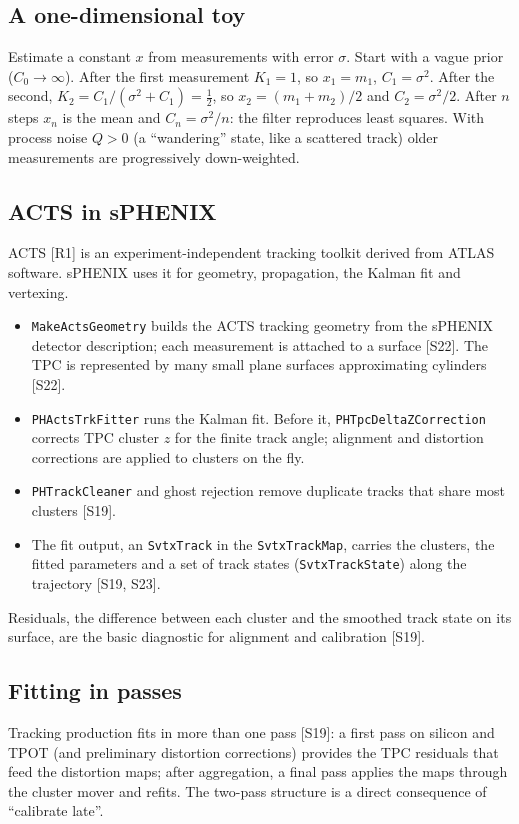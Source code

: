 \documentclass[11pt,letterpaper]{article}
\begin{document}
\subsection{A one-dimensional toy}
Estimate a constant $x$ from measurements with error $\sigma$. Start with a vague prior ($C_0\to\infty$).
After the first measurement $K_1=1$, so $x_1=m_1$, $C_1=\sigma^2$. After the second, $K_2=C_1/(\sigma^2+C_1)=\tfrac12$, so $x_2=(m_1+m_2)/2$ and $C_2=\sigma^2/2$.
After $n$ steps $x_n$ is the mean and $C_n=\sigma^2/n$: the filter reproduces least squares. With process noise $Q>0$ (a ``wandering'' state, like a scattered track) older measurements are progressively down-weighted.

\subsection{ACTS in sPHENIX}
ACTS [R1] is an experiment-independent tracking toolkit derived from ATLAS software. sPHENIX uses it for geometry, propagation, the Kalman fit and vertexing.
\begin{itemize}
\item \texttt{MakeActsGeometry} builds the ACTS tracking geometry from the sPHENIX detector description; each measurement is attached to a surface [S22].
The TPC is represented by many small plane surfaces approximating cylinders [S22].
\item \texttt{PHActsTrkFitter} runs the Kalman fit. Before it, \texttt{PHTpcDeltaZCorrection} corrects TPC cluster $z$ for the finite track angle; alignment and distortion corrections are applied to clusters on the fly.
\item \texttt{PHTrackCleaner} and ghost rejection remove duplicate tracks that share most clusters [S19].
\item The fit output, an \texttt{SvtxTrack} in the \texttt{SvtxTrackMap}, carries the clusters, the fitted parameters and a set of track states (\texttt{SvtxTrackState}) along the trajectory [S19, S23].
\end{itemize}
Residuals, the difference between each cluster and the smoothed track state on its surface, are the basic diagnostic for alignment and calibration [S19].

\subsection{Fitting in passes}
Tracking production fits in more than one pass [S19]: a first pass on silicon and TPOT (and preliminary distortion corrections) provides the TPC residuals that feed the distortion maps;
after aggregation, a final pass applies the maps through the cluster mover and refits.
The two-pass structure is a direct consequence of ``calibrate late''.
\end{document}
